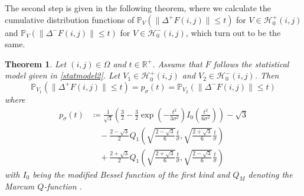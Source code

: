 \documentclass[a4paper,12pt]{article}
\newcommand{\norm}[1]{\lVert#1\rVert}
\theoremstyle{plain}
\newtheorem{theorem}{Theorem}[section]
\theoremstyle{definition}
\begin{document}
The second step is given in the following theorem, where we calculate the cumulative distribution functions of $\mathbb{P}_V( \norm{\Delta^+ F(i, j)} \leq t )$ for $V \in \mathcal{H}_0^+(i, j)$ and $\mathbb{P}_V( \norm{\Delta^- F(i, j)} \leq t )$ for $V \in \mathcal{H}_0^-(i, j)$, which turn out to be the same.

\begin{theorem}\label{thm: cdf}
	Let $(i, j) \in \Omega$ and $t \in \mathbb{R}^+$. Assume that $F$ follows the statistical model given in \eqref{statmodel2}. Let $V_1 \in \mathcal{H}_0^+(i, j)$ and $V_2 \in \mathcal{H}_0^-(i, j)$. Then
	\begin{equation}\label{eq: probequality}
		\mathbb{P}_{V_1}( \norm{\Delta^+ F(i, j)} \leq t ) = p_\sigma(t) = \mathbb{P}_{V_2}( \norm{\Delta^- F(i, j)} \leq t )
	\end{equation}
	where
	\begin{equation}\label{eq: cdf}
		\begin{aligned}
			p_\sigma(t) &\coloneqq \frac{1}{\sqrt{3}} \left( \frac{3}{2} - \frac{3}{2} \exp \left( - \frac{t^2}{3 \sigma^2} \right) I_0 \left( \frac{t^2}{6 \sigma^2} \right) \right) - \sqrt{3} \\
			&\quad - \frac{2 - \sqrt{3}}{2} Q_1 \left( \sqrt{\frac{2 - \sqrt{3}}{6}} \frac{t}{\sigma}, \sqrt{\frac{2 + \sqrt{3}}{6}} \frac{t}{\sigma} \right) \\
			&\quad + \frac{2 + \sqrt{3}}{2} Q_1 \left( \sqrt{\frac{2 + \sqrt{3}}{6}} \frac{t}{\sigma}, \sqrt{\frac{2 - \sqrt{3}}{6}} \frac{t}{\sigma} \right)
		\end{aligned}
	\end{equation}
	with $I_0$ being the modified Bessel function of the first kind \cite[p.~910-911]{TISP} and $Q_M$ denoting the Marcum $Q$-function \cite{IntQFunction}.
\end{theorem}
\end{document}
